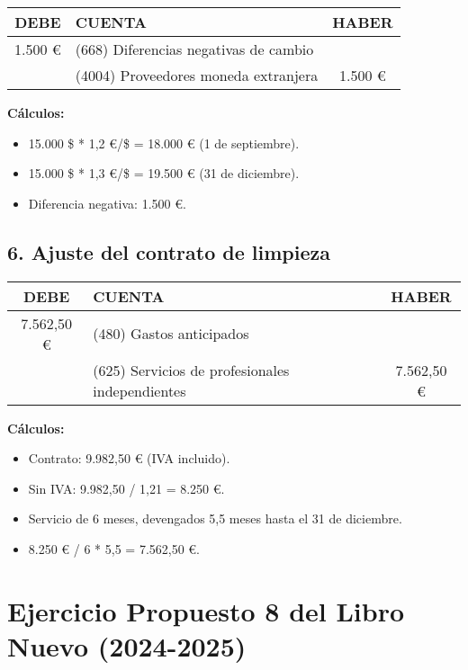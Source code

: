 \begin{table}[h!]
\centering
\begin{tabular}{|c|l|c|}
\hline
\textbf{DEBE} & \textbf{CUENTA} & \textbf{HABER} \\ \hline
1.500 €       & (668) Diferencias negativas de cambio & \\ \hline
              & (4004) Proveedores moneda extranjera & 1.500 € \\ \hline
\end{tabular}
\end{table}

\textbf{Cálculos:}
\begin{itemize}
    \item 15.000 \$ * 1,2 €/\$ = 18.000 € (1 de septiembre).
    \item 15.000 \$ * 1,3 €/\$ = 19.500 € (31 de diciembre).
    \item Diferencia negativa: 1.500 €.
\end{itemize}

\subsection*{6. Ajuste del contrato de limpieza}

\begin{table}[h!]
\centering
\begin{tabular}{|c|l|c|}
\hline
\textbf{DEBE} & \textbf{CUENTA} & \textbf{HABER} \\ \hline
7.562,50 €    & (480) Gastos anticipados & \\ \hline
              & (625) Servicios de profesionales independientes & 7.562,50 € \\ \hline
\end{tabular}
\end{table}

\textbf{Cálculos:}
\begin{itemize}
    \item Contrato: 9.982,50 € (IVA incluido).
    \item Sin IVA: 9.982,50 / 1,21 = 8.250 €.
    \item Servicio de 6 meses, devengados 5,5 meses hasta el 31 de diciembre.
    \item 8.250 € / 6 * 5,5 = 7.562,50 €.
\end{itemize}

\section*{Ejercicio Propuesto 8 del Libro Nuevo (2024-2025)}

